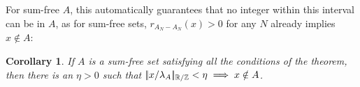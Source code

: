 \documentclass{article}
\newtheorem{corollary}{Corollary}[theorem]
\theoremstyle{definition}
\theoremstyle{remark}
\numberwithin{equation}{section}
\begin{document}
For sum-free $A$, this automatically guarantees that no integer within
this interval can be in $A$, as for sum-free sets, $r_{A_N-A_N}(x) >
0$ for any $N$ already implies $x \notin A$: 

\begin{corollary}
If $A$ is a sum-free set satisfying all the conditions of the theorem,
then there is an $\eta > 0$ such that $|\!|x/\lambda_A|\!|_{\mathbb{R}/\mathbb{Z}} < \eta
\implies x \notin A$.  
\end{corollary}










\end{document}
